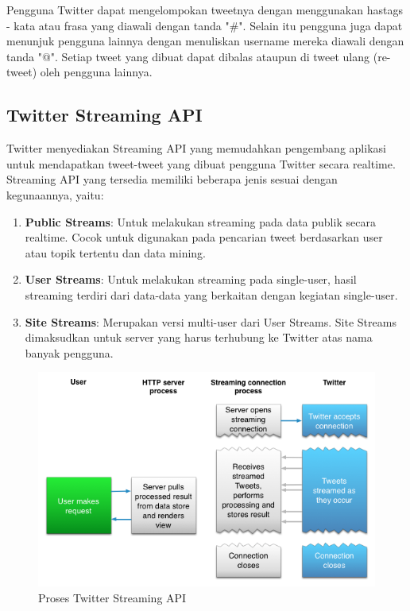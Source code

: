 Pengguna Twitter dapat mengelompokan tweetnya dengan menggunakan hastags - kata atau frasa yang diawali dengan tanda "\#". Selain itu pengguna juga dapat menunjuk pengguna lainnya dengan menuliskan username mereka diawali dengan tanda "@". Setiap tweet yang dibuat dapat dibalas ataupun di tweet ulang (re-tweet) oleh pengguna lainnya.

\subsection{Twitter Streaming API}
\label{sec:twitter_streaming_api}
Twitter menyediakan Streaming API yang memudahkan pengembang aplikasi untuk mendapatkan tweet-tweet yang dibuat pengguna Twitter secara realtime. Streaming API yang tersedia memiliki beberapa jenis sesuai dengan kegunaannya, yaitu:

\begin{enumerate}
	\item \textbf{Public Streams}: Untuk melakukan streaming pada data publik secara realtime. Cocok untuk digunakan pada pencarian tweet berdasarkan user atau topik tertentu dan data mining.
	\item \textbf{User Streams}: Untuk melakukan streaming pada single-user, hasil streaming terdiri dari data-data yang berkaitan dengan kegiatan single-user.
	\item	\textbf{Site Streams}: Merupakan versi multi-user dari User Streams. Site Streams dimaksudkan untuk server yang harus terhubung ke Twitter atas nama banyak pengguna.
\end{enumerate}

\begin{figure}
\centering
\includegraphics[scale=0.5]{Gambar/streaming-intro-2_1.png}
\caption[Proses Twitter Streaming API]{Proses Twitter Streaming API \cite{TwitterApi:2015}} 
\end{figure}

